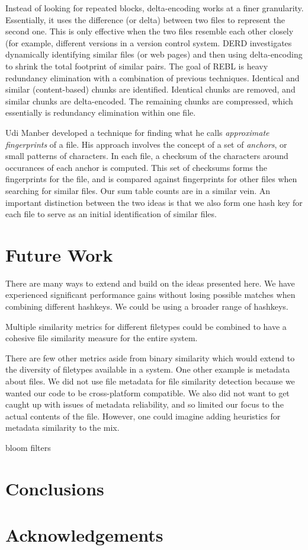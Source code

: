 \documentclass[10pt, twocolumn]{article}
\begin{document}
Instead of looking for repeated blocks, delta-encoding works at a finer granularity. Essentially, it uses the difference (or delta) between two files to represent the second one. This is only effective when the two files resemble each other closely (for example, different versions in a version control system. DERD \cite{derd} investigates dynamically identifying similar files (or web pages) and then using delta-encoding to shrink the total footprint of similar pairs. The goal of REBL \cite{rebl} is heavy redundancy elimination with a combination of previous techniques. Identical and similar (content-based) chunks are identified. Identical chunks are removed, and similar chunks are delta-encoded. The remaining chunks are compressed, which essentially is redundancy elimination within one file.

Udi Manber \cite{manber} developed a technique for finding what he calls \emph{approximate fingerprints} of a file. His approach involves the concept of a set of \emph{anchors}, or small patterns of characters. In each file, a checksum of the characters around occurances of each anchor is computed. This set of checksums forms the fingerprints for the file, and is compared against fingerprints for other files when searching for similar files. Our sum table counts are in a similar vein. An important distinction between the two ideas is that we also form one hash key for each file to serve as an initial identification of similar files. 

\section{Future Work}

There are many ways to extend and build on the ideas presented here. We have experienced significant performance gains without losing possible matches when combining different hashkeys. We could be using a broader range of hashkeys.

Multiple similarity metrics for different filetypes could be combined to have a cohesive file similarity measure for the entire system.

There are few other metrics aside from binary similarity which would extend to the diversity of filetypes available in a system. One other example is metadata about files. We did not use file metadata for file similarity detection because we wanted our code to be cross-platform compatible. We also did not want to get caught up with issues of metadata reliability, and so limited our focus to the actual contents of the file. However, one could imagine adding heuristics for metadata similarity to the mix. 

bloom filters

\section{Conclusions}

\section{Acknowledgements}


\end{document}

